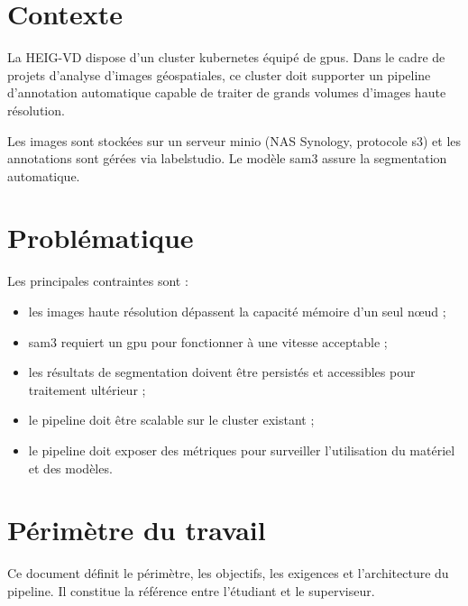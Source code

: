 \section{Contexte}

La HEIG-VD dispose d'un cluster \gls{kubernetes} équipé de \glspl{gpu}.
Dans le cadre de projets d'analyse d'images géospatiales, ce cluster doit supporter
un pipeline d'annotation automatique capable de traiter de grands volumes d'images haute résolution.

Les images sont stockées sur un serveur \gls{minio} (NAS Synology, protocole \gls{s3})
et les annotations sont gérées via \gls{labelstudio}.
Le modèle \gls{sam3} assure la segmentation automatique.

\section{Problématique}

Les principales contraintes sont :

\begin{itemize}
    \item les images haute résolution dépassent la capacité mémoire d'un seul nœud ;
    \item \gls{sam3} requiert un \gls{gpu} pour fonctionner à une vitesse acceptable ;
    \item les résultats de segmentation doivent être persistés et accessibles pour traitement ultérieur ;
    \item le pipeline doit être scalable sur le cluster existant ;
    \item le pipeline doit exposer des métriques pour surveiller l'utilisation du matériel et des modèles.
\end{itemize}

\section{Périmètre du travail}

Ce document définit le périmètre, les objectifs, les exigences et l'architecture du pipeline.
Il constitue la référence entre l'étudiant et le superviseur.
